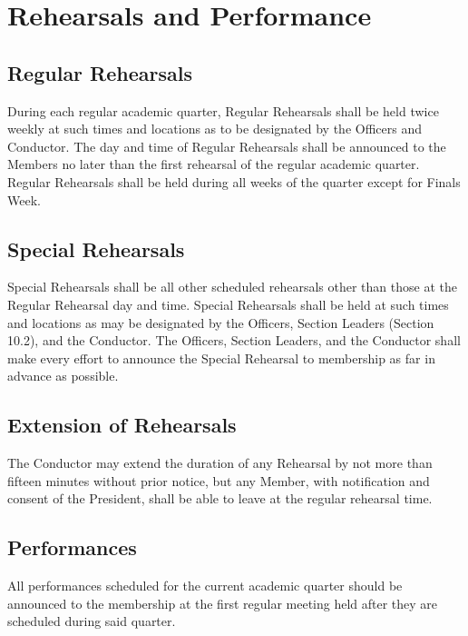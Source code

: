 \documentclass{article}
\begin{document}
\section{Rehearsals and Performance}

\subsection{Regular Rehearsals}

During each regular academic quarter, Regular Rehearsals shall be
held twice weekly at such times and locations as to be designated
by the Officers and Conductor. The day and time of Regular Rehearsals
shall be announced to the Members no later than the first rehearsal
of the regular academic quarter. Regular Rehearsals shall be held
during all weeks of the quarter except for Finals Week.

\subsection{Special Rehearsals}

Special Rehearsals shall be all other scheduled rehearsals other than
those at the Regular Rehearsal day and time. Special Rehearsals shall
be held at such times and locations as may be designated by the Officers,
Section Leaders (Section 10.2), and the Conductor. The Officers, Section Leaders, and the Conductor shall make every effort to announce the Special Rehearsal to membership as far in advance as possible.

\subsection{Extension of Rehearsals}

The Conductor may extend the duration of any Rehearsal by not more
than fifteen minutes without prior notice, but any Member, with notification
and consent of the President, shall be able to leave at the regular
rehearsal time.

\subsection{Performances}

All performances scheduled for the current academic quarter should
be announced to the membership at the first regular meeting held after
they are scheduled during said quarter.
\end{document}
